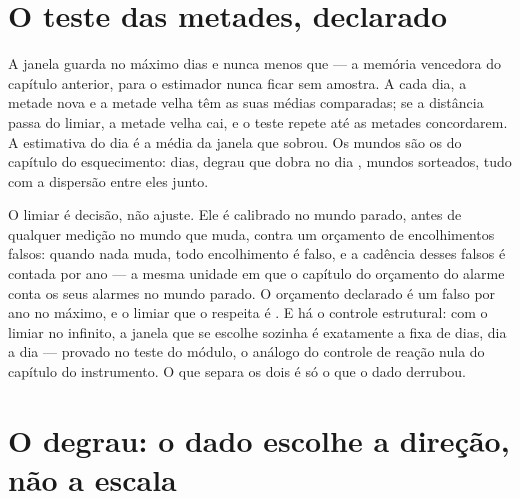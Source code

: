 \section{O teste das metades, declarado}

A janela guarda no máximo \numAdaptativaMaxima{} dias e nunca menos que \numAdaptativaMinima{} --- a
memória vencedora do capítulo anterior, para o estimador nunca ficar sem amostra. A cada dia, a
metade nova e a metade velha têm as suas médias comparadas; se a distância passa do limiar, a
metade velha cai, e o teste repete até as metades concordarem. A estimativa do dia é a média da
janela que sobrou. Os mundos são os do capítulo do esquecimento: \numAdaptativaDias{} dias, degrau
que dobra no dia \numAdaptativaQuandoMudanca{}, \numAdaptativaMundos{} mundos sorteados, tudo com a
dispersão entre eles junto.

O limiar é decisão, não ajuste. Ele é calibrado no mundo parado, antes de qualquer medição no mundo
que muda, contra um orçamento de encolhimentos falsos: quando nada muda, todo encolhimento é falso,
e a cadência desses falsos é contada por ano --- a mesma unidade em que o capítulo do orçamento do
alarme conta os seus alarmes no mundo parado. O orçamento declarado é um falso por ano no máximo, e
o limiar que o respeita é \numAdaptativaLimiarOrcado{}. E há o controle estrutural: com o limiar no
infinito, a janela que se escolhe sozinha é exatamente a fixa de \numAdaptativaMaxima{} dias, dia a
dia --- provado no teste do módulo, o análogo do controle de reação nula do capítulo do
instrumento. O que separa os dois é só o que o dado derrubou.

\section{O degrau: o dado escolhe a direção, não a escala}

